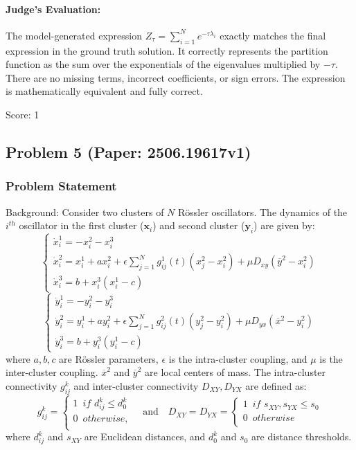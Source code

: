 \documentclass[10pt]{article}
\begin{document}
\paragraph*{Judge's Evaluation:}

The model-generated expression \( Z_{\tau} = \sum_{i=1}^N e^{-\tau \lambda_i} \) exactly matches the final expression in the ground truth solution. It correctly represents the partition function as the sum over the exponentials of the eigenvalues multiplied by \(-\tau\). There are no missing terms, incorrect coefficients, or sign errors. The expression is mathematically equivalent and fully correct.

Score: 1

\newpage
\subsection*{Problem 5 (Paper: 2506.19617v1)}
\subsubsection*{Problem Statement}
Background:
Consider two clusters of $N$ Rössler oscillators. The dynamics of the $i^{th}$ oscillator in the first cluster ($\mathbf{x}_i$) and second cluster ($\mathbf{y}_i$) are given by:
$$
\left\{ \begin{array}{l}
\dot x_i^1 =  - x_i^2 - x_i^3\\
\dot x_i^2 = x_i^1 + ax_i^2 + {\epsilon }\sum\limits_{j = 1}^N {g_{ij}^1(t)\left( {x_j^2 - x_i^2} \right)} + \mu {D_{xy}}\left( {\overline {y}^2   - x_i^2} \right) \\
\dot x_i^3 = b + x_i^3\left( {x_i^1 - c} \right)
\end{array} \right.
$$
$$
\left\{ \begin{array}{l}
\dot y_i^1 =  - y_i^2 - y_i^3\\
\dot y_i^2 = y_i^1 + ay_i^2 + {\epsilon }\sum\limits_{j = 1}^N {g_{ij}^2(t)\left( {y_j^2 - y_i^2} \right)} + \mu {D_{yx}}\left( {\overline {x}^2   - y_i^2} \right) \\
\dot y_i^3 = b + y_i^3\left( {y_i^1 - c} \right)
\end{array} \right.
$$
where $a, b, c$ are Rössler parameters, $\epsilon$ is the intra-cluster coupling, and $\mu$ is the inter-cluster coupling. $\overline{x}^2$ and $\overline{y}^2$ are local centers of mass. The intra-cluster connectivity $g_{ij}^k$ and inter-cluster connectivity $D_{XY}, D_{YX}$ are defined as:
$$
g_{ij}^k  = \left\{ \begin{array}{l}
 1\,\,\,if\,\,d_{ij}^k  \le d_0^k  \\
 0\,\,\,otherwise, \\
 \end{array} \right.
 \quad \text{and} \quad
D_{XY} = D_{YX}  = \left\{ \begin{array}{l}
 1\,\,\,if\,\,s_{XY},s_{YX}  \le s_0  \\
 0\,\,\,otherwise \\
 \end{array} \right.
$$
where $d_{ij}^k$ and $s_{XY}$ are Euclidean distances, and $d_0^k$ and $s_0$ are distance thresholds.
\end{document}
